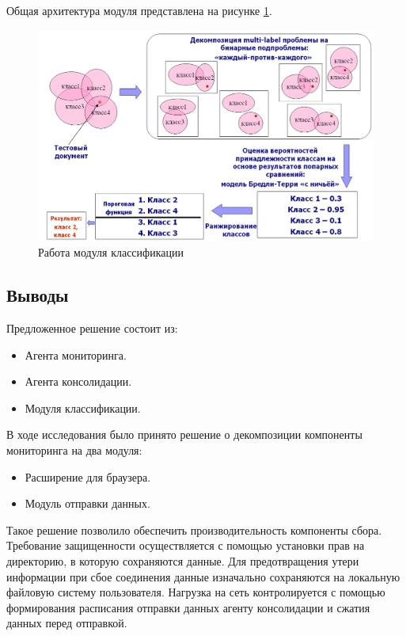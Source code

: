 \documentclass[russian, utf8, emptystyle]{eskdtext}
\begin{document}
Общая архитектура модуля представлена на рисунке \ref{fig:work_module}.
\begin{figure}[h]
	\begin{center}
		\includegraphics[width=14cm]{pic/module.png}
		\caption{Работа модуля классификации}
		\label{fig:work_module}
	\end{center}
\end{figure}
\subsection{Выводы}
Предложенное решение состоит из:
\begin{itemize}
	\item {Агента мониторинга.}
	\item {Агента консолидации.}
	\item{Модуля классификации.}
\end{itemize}

В ходе исследования было принято решение о декомпозиции компоненты мониторинга на два модуля:
\begin{itemize}
	\item Расширение для браузера.
	\item Модуль отправки данных.
\end{itemize}

Такое решение позволило обеспечить производительность компоненты сбора. Требование защищенности осуществляется с помощью установки прав на директорию, в которую сохраняются данные. Для предотвращения утери информации при сбое соединения данные изначально сохраняются на локальную файловую систему пользователя. Нагрузка на сеть контролируется с помощью  формирования расписания отправки данных агенту консолидации и сжатия данных перед отправкой.
\end{document}
